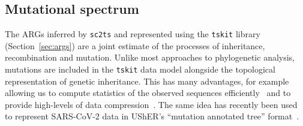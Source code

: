 \documentclass{article}
\begin{document}


\subsection{Mutational spectrum}
\label{sec:mutation_spectrum}
The ARGs inferred by \texttt{sc2ts} and represented using the \texttt{tskit}
library (Section~\ref{sec:args}) are a joint estimate of the processes
of inheritance, recombination and mutation. Unlike most approaches to
phylogenetic analysis, mutations are included in the \texttt{tskit}
data model alongside
the topological representation of genetic inheritance.
This has many
advantages, for example allowing us to compute statistics of the observed
sequences efficiently~\citep{Kelleher2016-wk,Ralph2020-efficiently} and
to provide high-levels of data compression~\citep{Kelleher2019-ba}.
The same idea has recently been used to represent
SARS-CoV-2 data in UShER's ``mutation annotated tree'' format~\citep{Turakhia2022-it}.
\end{document}
